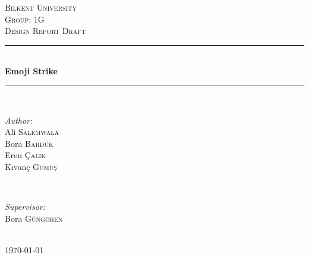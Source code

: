 \documentclass[12pt]{article} %
\begin{document}

\begin{titlepage}

\setcounter{secnumdepth}{5}

\newcommand{\HRule}{\rule{\linewidth}{0.5mm}} %

\center %

\textsc{\LARGE Bilkent University}\\[1.5cm] %
\textsc{\Large Group: 1G}\\[0.5cm] %
\textsc{\large Design Report Draft}\\[0.5cm] %

\HRule \\[0.4cm]
{ \huge \bfseries Emoji Strike }\\ %
\HRule \\[1.5cm]

\begin{minipage}{0.4\textwidth}
\begin{flushleft} \large
\emph{Author:}\\
Ali \textsc{Salemwala} 
\\ Bora \textsc{Bardük}
\\ Eren \textsc{Çalık}
\\ Kıvanç \textsc{Gümüş}
\end{flushleft}
\end{minipage}
~
\begin{minipage}{0.4\textwidth}
\begin{flushright} \large
\emph{Supervisor:} \\
Bora \textsc{Güngören} %
\end{flushright}
\end{minipage}\\[4cm]

{\large \today}\\[3cm] %


\vfill %

\end{titlepage}
\end{document}
